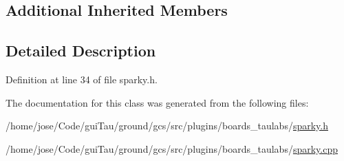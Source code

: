 \subsection*{Additional Inherited Members}


\subsection{Detailed Description}


Definition at line 34 of file sparky.\-h.



The documentation for this class was generated from the following files\-:\begin{DoxyCompactItemize}
\item 
/home/jose/\-Code/gui\-Tau/ground/gcs/src/plugins/boards\-\_\-taulabs/\hyperlink{sparky_8h}{sparky.\-h}\item 
/home/jose/\-Code/gui\-Tau/ground/gcs/src/plugins/boards\-\_\-taulabs/\hyperlink{sparky_8cpp}{sparky.\-cpp}\end{DoxyCompactItemize}
